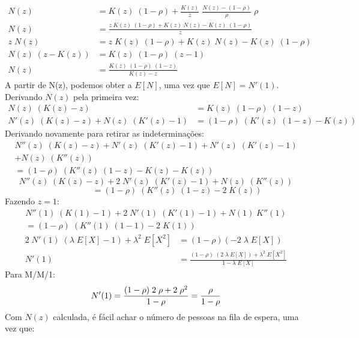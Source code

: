 \documentclass[a4paper]{article}
\newcommand{\E}[1]{E\!\left[#1\right]}
\begin{document}
\begin{align*}
    N(z) &= K(z) \; (1 - \rho)
        + \frac{K(z)}{z} \; \frac{N(z) - (1 - \rho)}{\rho}
        \; \rho \\
    N(z) &= \frac{z \; K(z) \; (1 - \rho)
        + K(z) \; N(z) - K(z) \; (1 - \rho)}{z} \\
    z \; N(z) &= z \; K(z) \; (1 - \rho)
        + K(z) \; N(z) - K(z) \; (1 - \rho) \\
    N(z) \; (z - K(z)) &= K(z) \; (1 - \rho) \; (z - 1) \\
    N(z) &= \frac{K(z) \; (1 - \rho) \; (1 - z)}{K(z) - z}
\end{align*}
A partir de N(z),
podemos obter a \(\E{N}\),
uma vez que \(\E{N} = N'(1)\).
Derivando \(N(z)\) pela primeira vez:
\begin{align*}
    N(z) \; (K(z) - z) &= K(z) \; (1 - \rho) \; (1-z) \\
    N'(z) \; (K(z) - z) +  N(z) \; (K'(z) - 1)
        &= (1 - \rho) \; (K'(z) \; (1 - z) - K(z))
\end{align*}
Derivando novamente para retirar as indeterminações:
\begin{align*}
    N''(z) \; (K(z) - z) + N'(z) \; (K'(z) - 1)
        + N'(z) \; (K'(z) - 1) \\
        + N(z) \; (K''(z)) \\
    = (1 - \rho) \; (K''(z) \; (1 - z) - K(z) - K(z))
\end{align*}
\[
   N''(z) \; (K(z) - z) + 2 \; N'(z) \; (K'(z) - 1)
        + N(z) \; (K''(z))
\] \[
    \qquad\qquad \quad
    = (1 - \rho) \; (K''(z) \; (1 - z) - 2 \; K(z))
\]
Fazendo \(z = 1\):
\begin{align*}
    N''(1) \; (K(1) - 1) + 2 \; N'(1) \; (K'(1) - 1)
        + N(1) \; K''(1) \\
        = (1 - \rho) \; (K''(1) \; (1 - 1) - 2 \; K(1))
\end{align*} \begin{align*}
    2 \; N'(1) \; (\lambda \; \E{X} - 1)
        + \lambda^2 \; \E{X^2}
        &= (1 - \rho)(- 2 \; \lambda \; \E{X}) \\
    N'(1) &= \frac{(1 - \rho) \; (2 \; \lambda \; \E{X})
        + \lambda^2 \; \E{X^2}}{1 - \lambda \; \E{X}}
\end{align*}
Para M/M/1:
\[
    N'(1) = \frac{(1 - \rho) \; 2 \; \rho
        + 2 \; \rho^2}{1 - \rho} \\
        = \frac{\rho}{1 - \rho}
\]
Com \(N(z)\) calculada, é fácil achar
o número de pessoas na fila de espera,
uma vez que:
\end{document}
